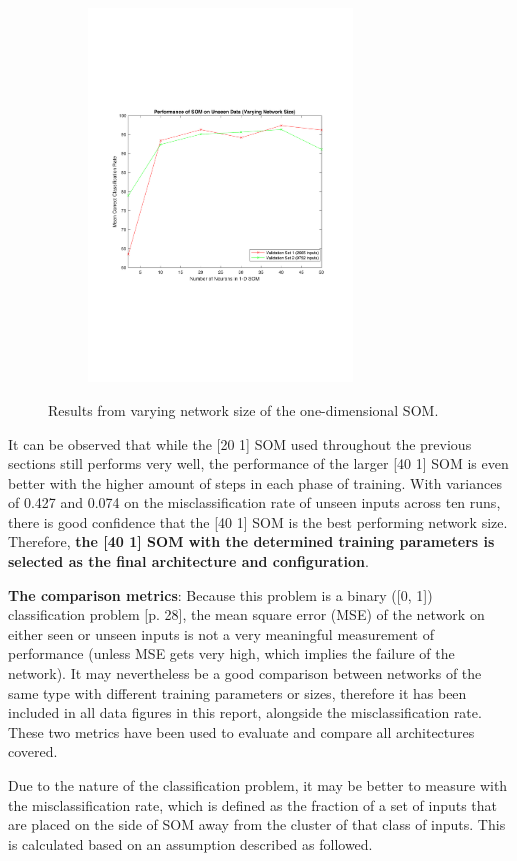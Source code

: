 \documentclass[10pt, oneside]{article}
\begin{document}
\begin{figure}[h]
\begin{subfigure}{0.5\textwidth}
\includegraphics[width=7cm, right]{final-testing-plot.pdf}
\end{subfigure}
\caption{\label{fig:size-testing} Results from varying network size of the one-dimensional SOM.}
\end{figure}

It can be observed that while the [20 1] SOM used throughout the previous sections still performs very well, the performance of the larger [40 1] SOM is even better with the higher amount of steps in each phase of training. With variances of 0.427 and 0.074 on the misclassification rate of unseen inputs across ten runs, there is good confidence that the [40 1] SOM is the best performing network size. Therefore, \textbf{the [40 1] SOM with the determined training parameters is selected as the final architecture and configuration}.

\textbf{The comparison metrics}: Because this problem is a binary ([0, 1]) classification problem \cite{candanedo2016accurate}[p. 28], the mean square error (MSE) of the network on either seen or unseen inputs is not a very meaningful measurement of performance (unless MSE gets very high, which implies the failure of the network). It may nevertheless be a good comparison between networks of the same type with different training parameters or sizes, therefore it has been included in all data figures in this report, alongside the misclassification rate. These two metrics have been used to evaluate and compare all architectures covered.

Due to the nature of the classification problem, it may be better to measure with the misclassification rate, which is defined as the fraction of a set of inputs that are placed on the side of SOM away from the cluster of that class of inputs. This is calculated based on an assumption described as followed.
\end{document}
